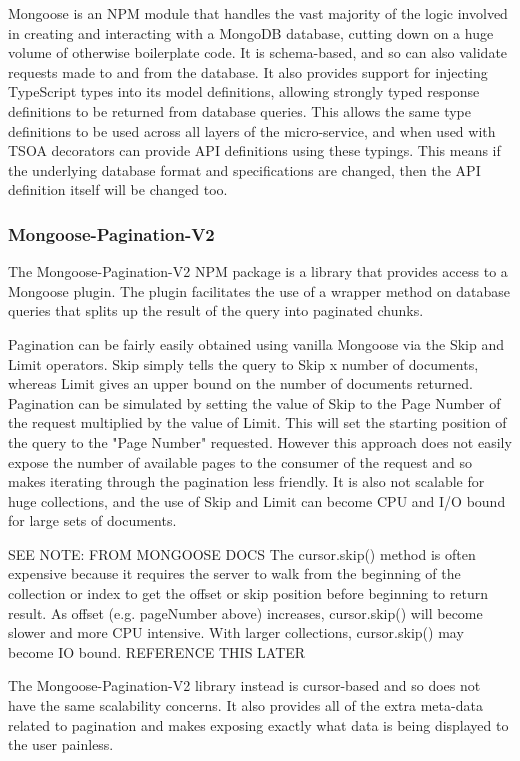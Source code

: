 Mongoose is an NPM module that handles the vast majority of the logic involved in creating and interacting with a MongoDB database, cutting down on a huge volume of otherwise boilerplate code. It is schema-based, and so can also validate requests made to and from the database. It also provides support for injecting TypeScript types into its model definitions, allowing strongly typed response definitions to be returned from database queries. This allows the same type definitions to be used across all layers of the micro-service, and when used with TSOA decorators can provide API definitions using these typings. This means if the underlying database format and specifications are changed, then the API definition itself will be changed too.
\subsubsection{Mongoose-Pagination-V2}
The Mongoose-Pagination-V2 NPM package is a library that provides access to a Mongoose plugin. The plugin facilitates the use of a wrapper method on database queries that splits up the result of the query into paginated chunks.

Pagination can be fairly easily obtained using vanilla Mongoose via the Skip and Limit operators. Skip simply tells the query to Skip x number of documents, whereas Limit gives an upper bound on the number of documents returned. Pagination can be simulated by setting the value of Skip to the Page Number of the request multiplied by the value of Limit. This will set the starting position of the query to the "Page Number" requested. However this approach does not easily expose the number of available pages to the consumer of the request and so makes iterating through the pagination less friendly. It is also not scalable for huge collections, and the use of Skip and Limit can become CPU and I/O bound for large sets of documents.

SEE NOTE:
FROM MONGOOSE DOCS 
The cursor.skip() method is often expensive because it requires the server to walk from the beginning of the collection or index to get the offset or skip position before beginning to return result. As offset (e.g. pageNumber above) increases, cursor.skip() will become slower and more CPU intensive. With larger collections, cursor.skip() may become IO bound.
REFERENCE THIS LATER

The Mongoose-Pagination-V2 library instead is cursor-based and so does not have the same scalability concerns. It also provides all of the extra meta-data related to pagination and makes exposing exactly what data is being displayed to the user painless.

